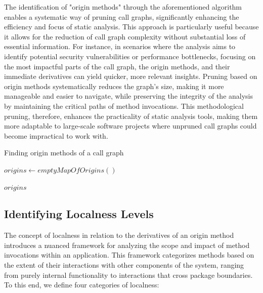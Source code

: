 The identification of "origin methods" through the aforementioned algorithm enables a systematic way of pruning call graphs, significantly enhancing the efficiency and focus of static analysis. This approach is particularly useful because it allows for the reduction of call graph complexity without substantial loss of essential information. 
For instance, in scenarios where the analysis aims to identify potential security vulnerabilities or performance bottlenecks, focusing on the most impactful parts of the call graph, the origin methods, and their immediate derivatives can yield quicker, more relevant insights. 
Pruning based on origin methods systematically reduces the graph's size, making it more manageable and easier to navigate, while preserving the integrity of the analysis by maintaining the critical paths of method invocations. This methodological pruning, therefore, enhances the practicality of static analysis tools, making them more adaptable to large-scale software projects where unpruned call graphs could become impractical to work with.

\begin{algorithm}
\caption{Finding origin methods of a call graph} \label{ch2:alg:origin}
\begin{algorithmic}[1]
\footnotesize
{}
    \State $origins \gets emptyMapOfOrigins()$
            \EndIf 
        \EndFor
    \EndFor
    
    \State \Return $origins$
\EndFunction
\end{algorithmic}
\end{algorithm}

\subsection{Identifying Localness Levels}\label{ch2:subsec:localness}
The concept of localness in relation to the derivatives of an origin method introduces a nuanced framework for analyzing the scope and impact of method invocations within an application. This framework categorizes methods based on the extent of their interactions with other components of the system, ranging from purely internal functionality to interactions that cross package boundaries. To this end, we define four categories of localness:

